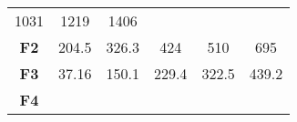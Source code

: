 \documentclass[12pt,a4paper]{article}
\begin{document}
\begin{longtable}[c]{@{}cccccc@{}}
\begin{minipage}[t]{0.09\columnwidth}\centering\strut
1031
\strut\end{minipage} &
\begin{minipage}[t]{0.10\columnwidth}\centering\strut
1219
\strut\end{minipage} &
\begin{minipage}[t]{0.10\columnwidth}\centering\strut
1406
\strut\end{minipage}\tabularnewline
\begin{minipage}[t]{0.12\columnwidth}\centering\strut
\textbf{F2}
\strut\end{minipage} &
\begin{minipage}[t]{0.07\columnwidth}\centering\strut
204.5
\strut\end{minipage} &
\begin{minipage}[t]{0.08\columnwidth}\centering\strut
326.3
\strut\end{minipage} &
\begin{minipage}[t]{0.09\columnwidth}\centering\strut
424
\strut\end{minipage} &
\begin{minipage}[t]{0.10\columnwidth}\centering\strut
510
\strut\end{minipage} &
\begin{minipage}[t]{0.10\columnwidth}\centering\strut
695
\strut\end{minipage}\tabularnewline
\begin{minipage}[t]{0.12\columnwidth}\centering\strut
\textbf{F3}
\strut\end{minipage} &
\begin{minipage}[t]{0.07\columnwidth}\centering\strut
37.16
\strut\end{minipage} &
\begin{minipage}[t]{0.08\columnwidth}\centering\strut
150.1
\strut\end{minipage} &
\begin{minipage}[t]{0.09\columnwidth}\centering\strut
229.4
\strut\end{minipage} &
\begin{minipage}[t]{0.10\columnwidth}\centering\strut
322.5
\strut\end{minipage} &
\begin{minipage}[t]{0.10\columnwidth}\centering\strut
439.2
\strut\end{minipage}\tabularnewline
\begin{minipage}[t]{0.12\columnwidth}\centering\strut
\textbf{F4}
\strut\end{minipage} &

\end{longtable}
\end{document}
